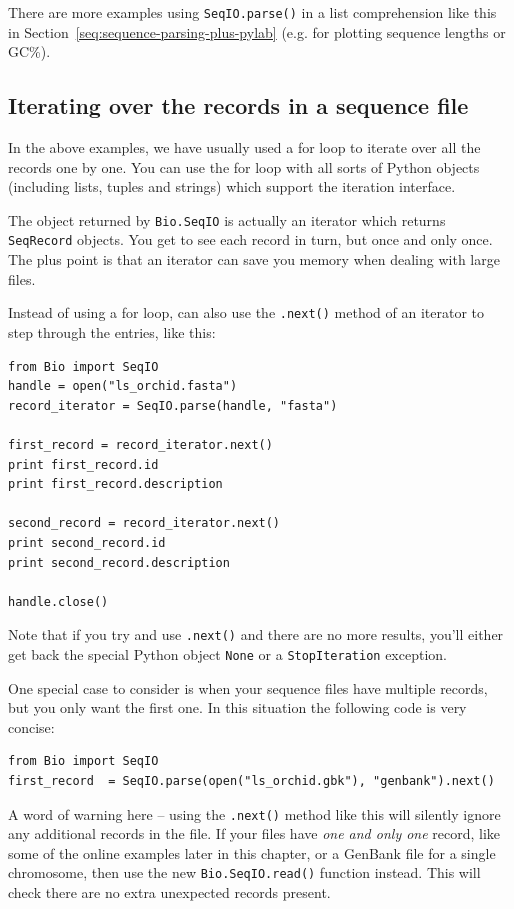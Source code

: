 \documentclass{report}
\begin{document}
\noindent There are more examples using \verb|SeqIO.parse()| in a list
comprehension like this in Section~\ref{seq:sequence-parsing-plus-pylab}
(e.g. for plotting sequence lengths or GC\%).

\subsection{Iterating over the records in a sequence file}

In the above examples, we have usually used a for loop to iterate over all the records one by one.  You can use the for loop with all sorts of Python objects (including lists, tuples and strings) which support the iteration interface.

The object returned by \verb|Bio.SeqIO| is actually an iterator which returns \verb|SeqRecord| objects.  You get to see each record in turn, but once and only once.  The plus point is that an iterator can save you memory when dealing with large files.

Instead of using a for loop, can also use the \verb|.next()| method of an iterator to step through the entries, like this:

\begin{verbatim}
from Bio import SeqIO
handle = open("ls_orchid.fasta")
record_iterator = SeqIO.parse(handle, "fasta")

first_record = record_iterator.next()
print first_record.id
print first_record.description

second_record = record_iterator.next()
print second_record.id
print second_record.description

handle.close()
\end{verbatim}

Note that if you try and use \verb|.next()| and there are no more results, you'll either get back the special Python object \verb|None| or a \verb|StopIteration| exception.

One special case to consider is when your sequence files have multiple records, but you only want the first one.  In this situation the following code is very concise:

\begin{verbatim}
from Bio import SeqIO
first_record  = SeqIO.parse(open("ls_orchid.gbk"), "genbank").next()
\end{verbatim}

A word of warning here -- using the \verb|.next()| method like this will silently ignore any additional records in the file.
If your files have {\it one and only one} record, like some of the online examples later in this chapter, or a GenBank file for a single chromosome, then use the new \verb|Bio.SeqIO.read()| function instead.
This will check there are no extra unexpected records present.
\end{document}
